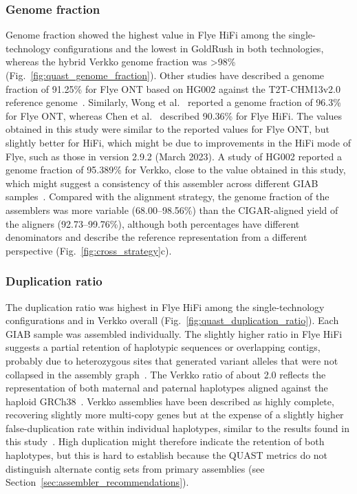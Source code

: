 \documentclass[12pt, letterpaper]{article}
\begin{document}
\subsubsection{Genome fraction}
Genome fraction showed the highest value in Flye HiFi among the single-technology configurations and the lowest in GoldRush in both technologies, whereas the hybrid Verkko genome fraction was >98\% (Fig.~\ref{fig:quast_genome_fraction}). Other studies have described a genome fraction of 91.25\% for Flye ONT based on HG002 against the T2T-CHM13v2.0 reference genome~\cite{Munoz2025}. Similarly, Wong et al.~\cite{Wong2023} reported a genome fraction of 96.3\% for Flye ONT, whereas Chen et al.~\cite{Chen2021} described 90.36\% for Flye HiFi. The values obtained in this study were similar to the reported values for Flye ONT, but slightly better for HiFi, which might be due to improvements in the HiFi mode of Flye, such as those in version 2.9.2 (March 2023). A study of HG002 reported a genome fraction of 95.389\% for Verkko, close to the value obtained in this study, which might suggest a consistency of this assembler across different GIAB samples~\cite{Espinosa2023}. Compared with the alignment strategy, the genome fraction of the assemblers was more variable (68.00--98.56\%) than the CIGAR-aligned yield of the aligners (92.73--99.76\%), although both percentages have different denominators and describe the reference representation from a different perspective (Fig.~\ref{fig:cross_strategy}c).

\subsubsection{Duplication ratio}
The duplication ratio was highest in Flye HiFi among the single-technology configurations and in Verkko overall (Fig.~\ref{fig:quast_duplication_ratio}). Each GIAB sample was assembled individually. The slightly higher ratio in Flye HiFi suggests a partial retention of haplotypic sequences or overlapping contigs, probably due to heterozygous sites that generated variant alleles that were not collapsed in the assembly graph~\cite{Guan2020,Nurk2020}. The Verkko ratio of about 2.0 reflects the representation of both maternal and paternal haplotypes aligned against the haploid GRCh38~\cite{Rautiainen2023}. Verkko assemblies have been described as highly complete, recovering slightly more multi-copy genes but at the expense of a slightly higher false-duplication rate within individual haplotypes, similar to the results found in this study~\cite{Rautiainen2023}. High duplication might therefore indicate the retention of both haplotypes, but this is hard to establish because the QUAST metrics do not distinguish alternate contig sets from primary assemblies (see Section~\ref{sec:assembler_recommendations}).
\end{document}
